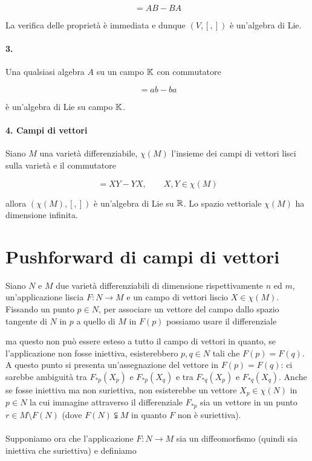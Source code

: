 \begin{equation}
	[A,B] = AB - BA
\end{equation}

La verifica delle proprietà è immediata e dunque $ (V,[,]) $ è un'algebra di Lie.

\paragraph{3.}

Una qualsiasi algebra $ A $ su un campo $ \mathbb{K} $ con commutatore

\begin{equation}
	[a,b] = ab - ba
\end{equation}

è un'algebra di Lie su campo $ \mathbb{K} $.

\paragraph{4. Campi di vettori}

Siano $ M $ una varietà differenziabile, $ \chi(M) $ l'insieme dei campi di vettori lisci sulla varietà e il commutatore

\begin{equation}
	[X,Y] = XY - YX, \qquad X,Y \in \chi(M)
\end{equation}

allora $ (\chi(M),[,]) $ è un'algebra di Lie su $ \mathbb{R} $. Lo spazio vettoriale $ \chi(M) $ ha dimensione infinita.

\section{Pushforward di campi di vettori}

Siano $ N $ e $ M $ due varietà differenziabili di dimensione rispettivamente $ n $ ed $ m $, un'applicazione liscia $ F : N \to M $ e un campo di vettori liscio $ X \in \chi(M) $. Fissando un punto $ p \in N $, per associare un vettore del campo dallo spazio tangente di $ N $ in $ p $ a quello di $ M $ in $ F(p) $ possiamo usare il differenziale


ma questo non può essere esteso a tutto il campo di vettori in quanto, se l'applicazione non fosse iniettiva, esisterebbero $ p,q \in N $ tali che $ F(p) = F(q) $. A questo punto si presenta un'assegnazione del vettore in $ F(p) = F(q) $: ci sarebbe ambiguità tra $ F_{*p}(X_{p}) $ e $ F_{*p}(X_{q}) $ e tra $ F_{*q}(X_{p}) $ e $ F_{*q}(X_{q}) $. Anche se fosse iniettiva ma non suriettiva, non esisterebbe un vettore $ X_{p} \in \chi(N) $ in $ p \in N $ la cui immagine attraverso il differenziale $ F_{*p} $ sia un vettore in un punto $ r \in M \setminus F(N) $ (dove $ F(N) \subsetneqq M $ in quanto $ F $ non è suriettiva).\\\\
%
Supponiamo ora che l'applicazione $ F : N \to M $ sia un diffeomorfismo (quindi sia iniettiva che suriettiva) e definiamo

